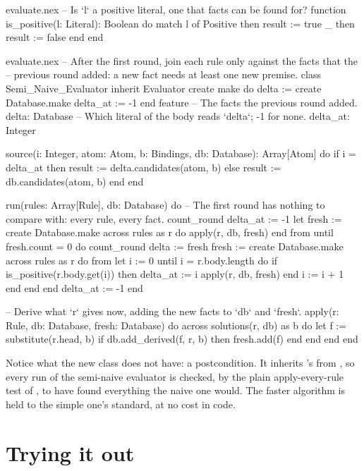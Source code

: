 \begin{append}{evaluate.nex}
-- Is `l` a positive literal, one that facts can be found for?
function is_positive(l: Literal): Boolean
do
  match l of
    Positive then result := true
    _        then result := false
  end
end
\end{append}

\begin{continued}{evaluate.nex}
-- After the first round, join each rule only against the facts that the
-- previous round added: a new fact needs at least one new premise.
class Semi_Naive_Evaluator inherit Evaluator
create
  make
  do
    delta := create Database.make
    delta_at := -1
  end
feature
  -- The facts the previous round added.
  delta: Database
  -- Which literal of the body reads `delta`; -1 for none.
  delta_at: Integer

  source(i: Integer, atom: Atom, b: Bindings, db: Database): Array[Atom]
  do
    if i = delta_at then
      result := delta.candidates(atom, b)
    else
      result := db.candidates(atom, b)
    end
  end

  run(rules: Array[Rule], db: Database)
  do
    -- The first round has nothing to compare with: every rule, every fact.
    count_round
    delta_at := -1
    let fresh := create Database.make
    across rules as r do
      apply(r, db, fresh)
    end
    from until fresh.count = 0 do
      count_round
      delta := fresh
      fresh := create Database.make
      across rules as r do
        from let i := 0 until i = r.body.length do
          if is_positive(r.body.get(i)) then
            delta_at := i
            apply(r, db, fresh)
          end
          i := i + 1
        end
      end
    end
    delta_at := -1
  end

  -- Derive what `r` gives now, adding the new facts to `db` and `fresh`.
  apply(r: Rule, db: Database, fresh: Database)
  do
    across solutions(r, db) as b do
      let f := substitute(r.head, b)
      if db.add_derived(f, r, b) then
        fresh.add(f)
      end
    end
  end
end
\end{continued}

Notice what the new class does not have: a postcondition. It inherits
's from , so every run of the semi-naive evaluator
is checked, by the plain apply-every-rule test of , to
have found everything the naive one would. The faster algorithm is held to
the simple one's standard, at no cost in code.

\section{Trying it out}

